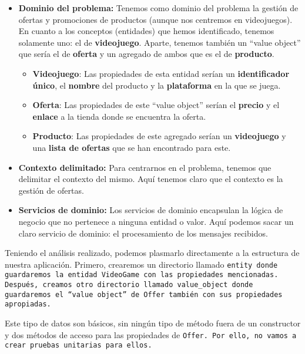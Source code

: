 \begin{itemize}
    \item \textbf{Dominio del problema:} Tenemos como dominio del problema la 
    gestión de ofertas y promociones de productos (aunque nos centremos en 
    videojuegos). En cuanto a los conceptos (entidades) que hemos identificado, 
    tenemos solamente uno: el de \textbf{videojuego}. Aparte, tenemos también un 
    ``value object'' que sería el de \textbf{oferta} y un agregado de ambos que es 
    el de \textbf{producto}.
    \begin{itemize}
        \item \textbf{Videojuego}: Las propiedades de esta entidad serían un 
        \textbf{identificador único}, el \textbf{nombre} del producto y la 
        \textbf{plataforma} en la que se juega.
        \item \textbf{Oferta}: Las propiedades de este ``value object'' serían el 
        \textbf{precio} y el \textbf{enlace} a la tienda donde se encuentra la 
        oferta.
        \item \textbf{Producto}: Las propiedades de este agregado serían un 
        \textbf{videojuego} y una \textbf{lista de ofertas} que se han encontrado 
        para este.
    \end{itemize}
    \item \textbf{Contexto delimitado:} Para centrarnos en el problema, tenemos que 
    delimitar el contexto del mismo. Aquí tenemos claro que el contexto es la 
    gestión de ofertas.
    \item \textbf{Servicios de dominio:} Los servicios de dominio encapsulan la 
    lógica de negocio que no pertenece a ninguna entidad o valor. Aquí podemos sacar 
    un claro servicio de dominio: el procesamiento de los mensajes recibidos.
\end{itemize}

Teniendo el análisis realizado, podemos plasmarlo directamente a la estructura de 
nuestra aplicación. Primero, crearemos un directorio llamado \tt{entity} donde 
guardaremos la entidad \tt{VideoGame} con las propiedades mencionadas. Después, 
creamos otro directorio llamado \tt{value\_object} donde guardaremos el ``value 
object'' de \tt{Offer} también con sus propiedades apropiadas.

Este tipo de datos son básicos, sin ningún tipo de método fuera de un constructor y 
dos métodos de acceso para las propiedades de \tt{Offer}. Por ello, no vamos a 
crear pruebas unitarias para ellos.


